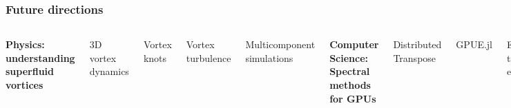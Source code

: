 \documentclass{beamer}
\begin{document}
\begin{frame}
\frametitle{Future directions}

\begin{columns}
\center
\textbf{Physics: understanding superfluid vortices}

\vspace{0.5cm}

3D vortex dynamics

\vspace{0.5cm}

Vortex knots

\vspace{0.5cm}

Vortex turbulence

\vspace{0.5cm}

Multicomponent simulations

\center

\textbf{Computer Science: Spectral methods for GPUs}

\vspace{0.5cm}

Distributed Transpose

\vspace{0.5cm}

GPUE.jl

\vspace{0.5cm}

Expression tree extensions

\vspace{0.5cm}

Compression methods

\end{columns}
\end{frame}
\end{document}
